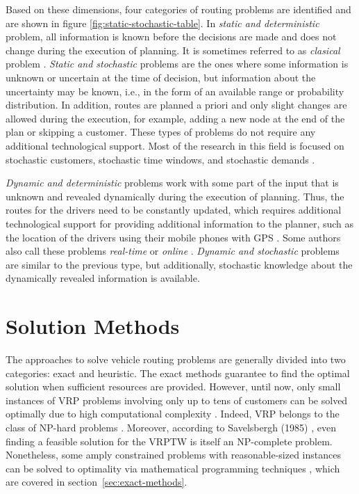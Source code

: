 Based on these dimensions, four categories of routing problems are identified and are shown in figure \ref{fig:static-stochastic-table}. In \emph{static and deterministic} problem, all information is known before the decisions are made and does not change during the execution of planning. It is sometimes referred to as \emph{clasical} problem \cite{PILLAC20131}. \emph{Static and stochastic} problems are the ones where some information is unknown or uncertain at the time of decision, but information about the uncertainty may be known, i.e., in the form of an available range or probability distribution. In addition, routes are planned a priori and only slight changes are allowed during the execution, for example, adding a new node at the end of the plan or skipping a customer. These types of problems do not require any additional technological support. Most of the research in this field is focused on stochastic customers, stochastic time windows, and stochastic demands \cite{GENDREAU19963, 2007-cordeau, stoch-demands}.

\emph{Dynamic and deterministic} problems work with some part of the input that is unknown and revealed dynamically during the execution of planning. Thus, the routes for the drivers need to be constantly updated, which requires additional technological support for providing additional information to the planner, such as the location of the drivers using their mobile phones with GPS \cite{2007-cordeau, online-routing-2007}. Some authors also call these problems \emph{real-time} or \emph{online} \cite{online-routing-2007}. \emph{Dynamic and stochastic} problems are similar to the previous type, but additionally, stochastic knowledge about the dynamically revealed information is available.



\section{Solution Methods}

The approaches to solve vehicle routing problems are generally divided into two categories: exact and heuristic. The exact methods guarantee to find the optimal solution when sufficient resources are provided. However, until now, only small instances of VRP problems involving only up to tens of customers can be solved optimally due to high computational complexity \cite{toth2015vrp, Peng2020}. Indeed, VRP belongs to the class of NP-hard problems \cite{time-complexity-vrp}. Moreover, according to Savelsbergh (1985) \cite{Savelsbergh1985}, even finding a feasible solution for the VRPTW is itself an NP-complete problem. Nonetheless, some amply constrained problems with reasonable-sized instances can be solved to optimality via mathematical programming techniques \cite{2007-cordeau}, which are covered in section~\ref{sec:exact-methods}.

